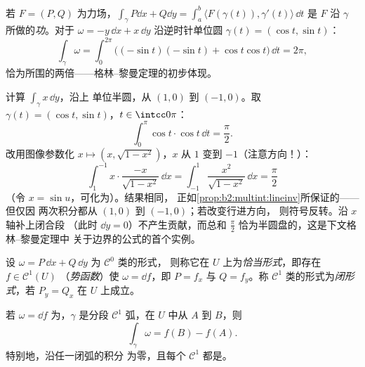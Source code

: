 \begin{example}[力所做的功；环量]\label{ex:b2:multint:work}
若 $F = (P, Q)$ 为力场，$\int_\gamma P\dd x + Q\dd y =
\int_a^b \langle F(\gamma(t)), \gamma'(t)\rangle\,\dd t$ 是
$F$ 沿 $\gamma$ 所做的\emph{功}。对于 $\omega = -y\,\dd x +
x\,\dd y$ 沿逆时针单位圆 $\gamma(t) =
(\cos t, \sin t)$：
\[
\int_\gamma \omega
= \int_0^{2\pi}\bigl((-\sin t)(-\sin t)
+ \cos t\cos t\bigr)\,\dd t = 2\pi ,
\]
恰为所围的两倍——格林--黎曼定理的初步体现。
\end{example}

\begin{example}\label{ex:b2:multint:semicircle}
计算 $\int_\gamma x\,\dd y$，沿上
单位半圆，从 $(1, 0)$ 到 $(-1, 0)$。取 $\gamma(t) =
(\cos t, \sin t)$，$t \in \intcc0\pi$：
\[
\int_0^\pi\cos t\cdot\cos t\,\dd t = \frac\pi2 .
\]
改用图像参数化 $x \mapsto (x, \sqrt{1 -
x^2})$，$x$ 从 $1$ 变到 $-1$（注意方向！）：
\[
\int_1^{-1}x\cdot\frac{-x}{\sqrt{1 - x^2}}\,\dd x
= \int_{-1}^{1}\frac{x^2}{\sqrt{1 - x^2}}\,\dd x
= \frac\pi2
\]
（令 $x = \sin u$，可化为）。结果相同，
正如\cref{prop:b2:multint:lineinv}所保证的——但仅因
两次积分都从 $(1,0)$ 到 $(-1,0)$；若改变行进方向，
则符号反转。沿 $x$ 轴补上闭合段
（此时 $\dd y = 0$）不产生贡献，而总和 $\frac\pi2$
恰为半圆盘的，这是下文格林--黎曼定理中
关于边界的公式的首个实例。
\end{example}

\begin{definition}[恰当形式与闭形式]\label{def:b2:multint:exact}
设 $\omega = P\,\dd x + Q\,\dd y$ 为 $\mathcal{C}^0$ 类的形式，
则称它在 $U$ 上为\emph{恰当形式}，即存在 $f \in \mathcal{C}^1(U)$
（\emph{势函数}）使 $\omega = \dd f$，即 $P = f_x$ 与 $Q
= f_y$。称 $\mathcal{C}^1$ 类的形式为\emph{闭形式}，若 $P_y = Q_x$ 在
$U$ 上成立。
\end{definition}

\begin{theorem}\label{thm:b2:multint:ftc}
若 $\omega = \dd f$ 为，$\gamma$ 是分段
$\mathcal{C}^1$ 弧，在 $U$ 中从 $A$ 到 $B$，则
\[
\int_\gamma \omega = f(B) - f(A) .
\]
特别地，沿任一闭弧的积分
为零，且每个 $\mathcal{C}^1$ 都是。
\end{theorem}

